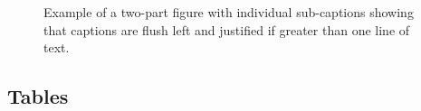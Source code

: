 \documentclass[]{interact}
\theoremstyle{plain}%
\theoremstyle{definition}
\theoremstyle{remark}
\begin{document}
\begin{figure}[h]
\centering
{}\hspace{5pt}
\caption{Example of a two-part figure with individual sub-captions
 showing that captions are flush left and justified if greater
 than one line of text.} \label{sample-figure}
\end{figure}

\subsection{Tables}
\end{document}
